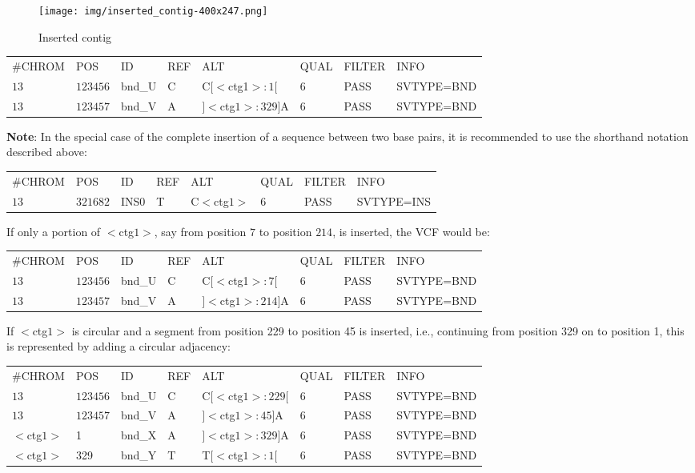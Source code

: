 \documentclass[8pt]{article}
\begin{document}
\begin{figure}[h]
\centering
\texttt{[image: img/inserted\_contig-400x247.png]}
\caption{Inserted contig}
\end{figure}

\vspace{0.3cm}
\small
\begin{tabular}{ l l l l l l l l }
\#CHROM & POS & ID & REF & ALT & QUAL & FILTER & INFO \\
$13$ & $123456$ & bnd\_U & C & C$[<$ctg1$>:1[$ & $6$ & PASS & SVTYPE=BND \\
$13$ & $123457$ & bnd\_V & A & $]<$ctg$1>:329]$A & $6$ & PASS & SVTYPE=BND \\
\end{tabular}
\normalsize
\vspace{0.3cm}

\textbf{Note}: In the special case of the complete insertion of a sequence between two base pairs, it is recommended to use the shorthand notation described above:

\vspace{0.3cm}
\begin{tabular}{ l l l l l l l l }
\#CHROM & POS & ID & REF & ALT & QUAL & FILTER & INFO \\
$13$ & $321682$ & INS0 & T & C$<$ctg$1>$ & $6$ & PASS & SVTYPE=INS \\
\end{tabular}
\vspace{0.3cm}

If only a portion of $<$ctg$1>$, say from position $7$ to position $214$, is inserted, the VCF would be:

\vspace{0.3cm}
\small
\begin{tabular}{ l l l l l l l l }
\#CHROM & POS & ID & REF & ALT & QUAL & FILTER & INFO \\
$13$ & $123456$ & bnd\_U & C & C$[<$ctg1$>:7[$ & $6$ & PASS & SVTYPE=BND \\
$13$ & $123457$ & bnd\_V & A & $]<$ctg$1>:214]$A & $6$ & PASS & SVTYPE=BND \\
\end{tabular}
\normalsize
\vspace{0.3cm}

If $<$ctg$1>$ is circular and a segment from position 229 to position 45 is inserted, i.e., continuing from position 329 on to position 1, this is represented by adding a circular adjacency:

\vspace{0.3cm}
\small
\begin{tabular}{ l l l l l l l l }
\#CHROM & POS & ID & REF & ALT & QUAL & FILTER & INFO \\
$13$ & $123456$ & bnd\_U & C & C$[<$ctg$1>:229[$ & 6 & PASS & SVTYPE=BND \\
$13$ & $123457$ & bnd\_V & A & $]<$ctg$1>:45]$A & 6 & PASS & SVTYPE=BND \\
$<$ctg$1>$ & 1 & bnd\_X & A & $]<$ctg$1>:329]$A & 6 & PASS & SVTYPE=BND \\
$<$ctg$1>$ & 329 & bnd\_Y & T & T$[<$ctg$1>:1[$ & 6 & PASS & SVTYPE=BND \\
\end{tabular}
\normalsize
\end{document}
